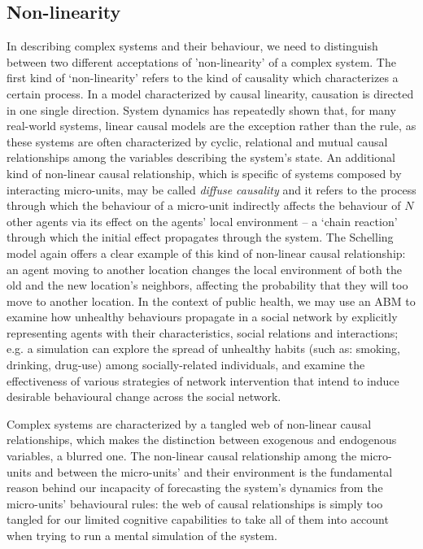 \documentclass[review]{elsarticle}
\begin{document}
\subsection{Non-linearity}
In describing complex systems and their behaviour, we need to distinguish between two different acceptations of 'non-linearity' of a complex system. The first kind of `non-linearity' refers to the kind of causality which characterizes a certain process. In a model characterized by causal linearity, causation is directed in one single direction. System dynamics has repeatedly shown that, for many real-world systems, linear causal models are the exception rather than the rule, as these systems are often characterized by cyclic, relational and mutual causal relationships among the variables describing the system's state. An additional kind of non-linear causal relationship, which is specific of systems composed by interacting micro-units, may be called \textit{diffuse causality} and it refers to the process through which the behaviour of a micro-unit indirectly affects the behaviour of $N$ other agents via its effect on the agents' local environment -- a `chain reaction' through which the initial effect propagates through the system. The Schelling model again offers a clear example of this kind of non-linear causal relationship: an agent moving to another location changes the local environment of both the old and the new location's neighbors, affecting the probability that they will too move to another location. In the context of public health, we may use an ABM to examine how unhealthy behaviours propagate in a social network by explicitly representing agents with their characteristics, social relations and interactions; e.g. a simulation can explore the spread of unhealthy habits (such as: smoking, drinking, drug-use) among socially-related individuals, and examine the effectiveness of various strategies of network intervention that intend to induce desirable behavioural change across the social network.

Complex systems are characterized by a tangled web of non-linear causal relationships, which makes the distinction between exogenous and endogenous variables, a blurred one. The non-linear causal relationship among the micro-units and between the micro-units' and their environment is the fundamental reason behind our incapacity of forecasting the system's dynamics from the micro-units' behavioural rules: the web of causal relationships is simply too tangled for our limited cognitive capabilities to take all of them into account when trying to run a mental simulation of the system. 
\end{document}
